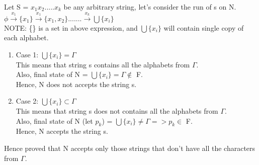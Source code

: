 \documentclass{article}
\begin{document}
    Let S = $x_1 x_2 ..... x_k$ be any arbitrary string, let's consider the run of s on N.\\
    $\phi \xrightarrow{x_1} \{x_1\} \xrightarrow{x_1} \{x_1,x_2\} ....... \xrightarrow{x_k} \bigcup \{x_i\}$\\
    NOTE: \{\} is a set in above expression, and $\bigcup \{x_i\}$ will contain single copy of each alphabet.\\
    \begin{enumerate}
        \item Case 1: $\bigcup \{x_i\} = \Gamma$ \\
        This means that string s contains all the alphabets from $\Gamma $.\\
        Also, final state of N = $\bigcup \{x_i\} = \Gamma \notin $ F.\\
        Hence, N does not accepts the string s.
        \pagebreak
        \item Case 2: $\bigcup \{x_i\} \subset \Gamma$ \\
        This means that string s does not contains all the alphabets from $\Gamma $.\\
        Also, final state of N (let $p_k$) = $\bigcup \{x_i\} \neq \Gamma => p_k \in $ F.\\
        Hence, N accepts the string s.\\
    \end{enumerate}

Hence proved that N accepts only those strings that don't have all the characters from $\Gamma $.\\
\pagebreak
\end{document}
